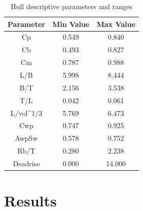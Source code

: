 \documentclass[twoside,twocolumn]{article}
\begin{document}
\begin{table}[]
\centering
\caption{Hull descriptive parameters and ranges}
\label{tab:hull_parameters}
\begin{tabular}{@{}ccc@{}}
\toprule
\textbf{Parameter} & \textbf{Min Value} & \textbf{Max Value} \\ \midrule
Cp & 0.549 & 0.840 \\
Cb & 0.493 & 0.827 \\
Cm & 0.787 & 0.988 \\
L/B & 5.998 & 8.444 \\
B/T & 2.156 & 3.538 \\
T/L & 0.042 & 0.061 \\
L/vol\textasciicircum{}1/3 & 5.769 & 6.473 \\
Cwp & 0.747 & 0.925 \\
AwpSw & 0.578 & 0.752 \\
Rb/T & 0.280 & 2.238 \\
Deadrise & 0.000 & 14.000 \\ \bottomrule
\end{tabular}
\end{table}

\begin{table}[]
\centering
\caption{Network hyperparameters used to build the feed forward neural network}
\label{tab:network_parameters}
\end{table}


\section{Results}
\end{document}
